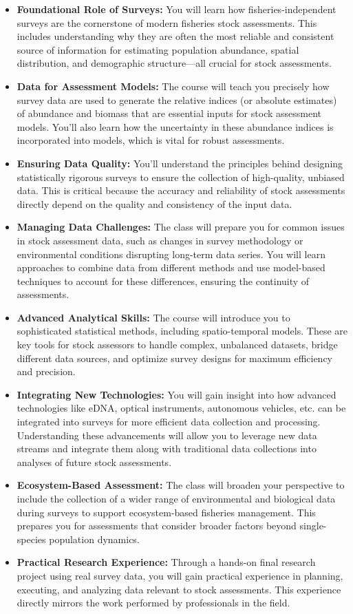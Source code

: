 \documentclass[
  letterpaper,
  oneside,
  open=any]{scrbook}
\providecommand{\tightlist}{%
  \setlength{\itemsep}{0pt}\setlength{\parskip}{0pt}}\usepackage{longtable,booktabs,array}
\begin{document}
\begin{itemize}
\tightlist
\item
  \textbf{Foundational Role of Surveys:} You will learn how
  fisheries-independent surveys are the cornerstone of modern fisheries
  stock assessments. This includes understanding why they are often the
  most reliable and consistent source of information for estimating
  population abundance, spatial distribution, and demographic
  structure---all crucial for stock assessments.
\item
  \textbf{Data for Assessment Models:} The course will teach you
  precisely how survey data are used to generate the relative indices
  (or absolute estimates) of abundance and biomass that are essential
  inputs for stock assessment models. You'll also learn how the
  uncertainty in these abundance indices is incorporated into models,
  which is vital for robust assessments.
\item
  \textbf{Ensuring Data Quality:} You'll understand the principles
  behind designing statistically rigorous surveys to ensure the
  collection of high-quality, unbiased data. This is critical because
  the accuracy and reliability of stock assessments directly depend on
  the quality and consistency of the input data.
\item
  \textbf{Managing Data Challenges:} The class will prepare you for
  common issues in stock assessment data, such as changes in survey
  methodology or environmental conditions disrupting long-term data
  series. You will learn approaches to combine data from different
  methods and use model-based techniques to account for these
  differences, ensuring the continuity of assessments.
\item
  \textbf{Advanced Analytical Skills:} The course will introduce you to
  sophisticated statistical methods, including spatio-temporal models.
  These are key tools for stock assessors to handle complex, unbalanced
  datasets, bridge different data sources, and optimize survey designs
  for maximum efficiency and precision.
\item
  \textbf{Integrating New Technologies:} You will gain insight into how
  advanced technologies like eDNA, optical instruments, autonomous
  vehicles, etc. can be integrated into surveys for more efficient data
  collection and processing. Understanding these advancements will allow
  you to leverage new data streams and integrate them along with
  traditional data collections into analyses of future stock
  assessments.
\item
  \textbf{Ecosystem-Based Assessment:} The class will broaden your
  perspective to include the collection of a wider range of
  environmental and biological data during surveys to support
  ecosystem-based fisheries management. This prepares you for
  assessments that consider broader factors beyond single-species
  population dynamics.
\item
  \textbf{Practical Research Experience:} Through a hands-on final
  research project using real survey data, you will gain practical
  experience in planning, executing, and analyzing data relevant to
  stock assessments. This experience directly mirrors the work performed
  by professionals in the field.
\end{itemize}
\end{document}

